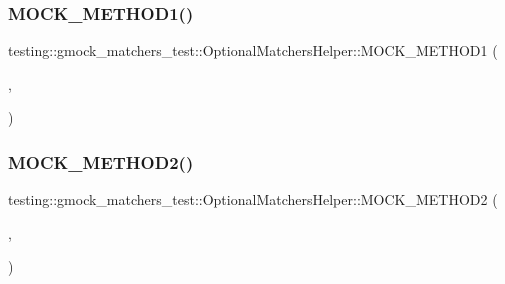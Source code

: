 \mbox{\label{classtesting_1_1gmock__matchers__test_1_1_optional_matchers_helper_a782311cb85f341cf6b45f0b9f015e779}} 
\subsubsection{\texorpdfstring{MOCK\_METHOD1()}{MOCK\_METHOD1()}\hspace{0.1cm}{\footnotesize\ttfamily [2/2]}}
{\footnotesize\ttfamily testing\+::gmock\+\_\+matchers\+\_\+test\+::\+Optional\+Matchers\+Helper\+::\+M\+O\+C\+K\+\_\+\+M\+E\+T\+H\+O\+D1 (\begin{DoxyParamCaption}\item[{Overloaded}]{,  }\item[{int(char \mbox{\hyperlink{_obj__test_2lib_2googletest-master_2googlemock_2test_2gmock-matchers__test_8cc_a6150e0515f7202e2fb518f7206ed97dc}{x}})}]{ }\end{DoxyParamCaption})}

\mbox{\label{classtesting_1_1gmock__matchers__test_1_1_optional_matchers_helper_a51f6da96a6607d70c8ea6d5f4aedb39f}} 
\subsubsection{\texorpdfstring{MOCK\_METHOD2()}{MOCK\_METHOD2()}\hspace{0.1cm}{\footnotesize\ttfamily [1/2]}}
{\footnotesize\ttfamily testing\+::gmock\+\_\+matchers\+\_\+test\+::\+Optional\+Matchers\+Helper\+::\+M\+O\+C\+K\+\_\+\+M\+E\+T\+H\+O\+D2 (\begin{DoxyParamCaption}\item[{Two\+Args}]{,  }\item[{int(char \mbox{\hyperlink{_obj__test_2lib_2googletest-master_2googlemock_2test_2gmock-matchers__test_8cc_a6150e0515f7202e2fb518f7206ed97dc}{x}}, int \mbox{\hyperlink{_obj__test_2lib_2googletest-master_2googlemock_2test_2gmock-matchers__test_8cc_a39cb44155237f0205e0feb931d5acbed}{y}})}]{ }\end{DoxyParamCaption})}

